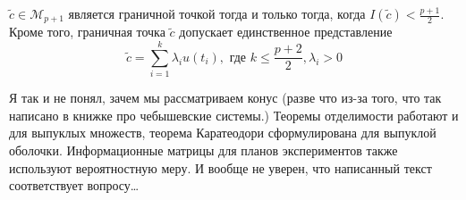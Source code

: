 \begin{thm}
$\tilde{c} \in \mathcal{M}_{p+1}$ является граничной точкой тогда и только тогда, когда $I(\tilde{c}) < \frac{p+1}{2}$. Кроме того, граничная точка $\tilde{c}$ допускает единственное представление
$$\tilde{c} = \sum\limits_{i=1}^{k}\lambda_i u(t_i), \text{ где } k \leq \frac{p+2}{2}, \lambda_i > 0$$
\end{thm}

{\color{blue} Я так и не понял, зачем мы рассматриваем конус (разве что из-за того, что так написано в книжке про чебышевские системы.) Теоремы отделимости работают и для выпуклых множеств, теорема Каратеодори сформулирована для выпуклой оболочки. Информационные матрицы для планов экспериментов также используют вероятностную меру. И вообще не уверен, что написанный текст соответствует вопросу…}